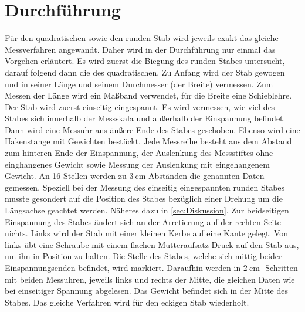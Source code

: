 \section{Durchführung}
\label{sec:Durchführung}
Für den quadratischen sowie den runden Stab wird jeweils exakt das gleiche Messverfahren 
angewandt. Daher wird in der Durchführung nur einmal das Vorgehen erläutert. 
Es wird zuerst die Biegung des runden Stabes untersucht, darauf folgend dann die 
des quadratischen. Zu Anfang wird der Stab gewogen und in seiner Länge und seinem 
Durchmesser (der Breite) vermessen. Zum Messen der Länge wird ein Maßband verwendet,
für die Breite eine Schieblehre. Der Stab wird zuerst einseitig eingespannt. Es wird 
vermessen, wie viel des Stabes sich innerhalb der Messskala und außerhalb der Einspannung 
befindet. Dann wird eine Messuhr ans äußere Ende des Stabes geschoben. Ebenso wird eine
Hakenstange mit Gewichten bestückt. Jede Messreihe besteht aus dem Abstand zum hinteren 
Ende der Einspannung, der Auslenkung des Messstiftes ohne einghangenes Gewicht sowie Messung 
der Auslenkung mit eingehangenem Gewicht. An 16 Stellen werden zu $\qty{3}{\centi\meter}$-Abständen 
die genannten Daten gemessen. Speziell bei der Messung des einseitig eingespannten runden 
Stabes musste gesondert auf die Position des Stabes bezüglich einer Drehung um die 
Längsachse geachtet werden. Näheres dazu in \autoref{sec:Diskussion}. Zur 
beidseitigen Einspannung des Stabes ändert sich an der Arretierung auf der rechten 
Seite nichts. Links wird der Stab mit einer kleinen Kerbe auf eine Kante gelegt. 
Von links übt eine Schraube mit einem flachen Mutteraufsatz Druck auf den Stab aus,
um ihn in Position zu halten. Die Stelle des Stabes, welche sich mittig beider 
Einspannungsenden befindet, wird markiert. Daraufhin werden in $\qty{2}{\centi\meter}$
-Schritten mit beiden Messuhren, jeweils links und rechts der Mitte, die gleichen 
Daten wie bei einseitiger Spannung abgelesen. Das Gewicht befindet sich in der Mitte 
des Stabes. Das gleiche Verfahren wird für den eckigen Stab wiederholt. 
